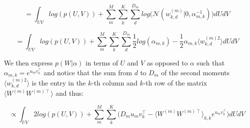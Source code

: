 \documentclass{article}
\begin{document}
$$ = \int_{UV}{log(p(U,V)) + \sum_m^M{\sum_k^K{\sum_d^{D_m}{log\Big(\mathcal{N}(w_{k,d}^{(m)}|0,\alpha_{m,k}^{-1})\Big)}}}dUdV}$$

$$ = \int_{UV}{log(p(U,V)) + \sum_m^M{\sum_k^K{\sum_d^{D_m}{\frac{1}{2}log(\alpha_{m,k}) - \frac{1}{2}\alpha_{m,k}\langle w_{k,d}^{(m)2}\rangle }}}dUdV}$$

We then express $p(W|\alpha)$ in terms of $U$ and $V$ as opposed to $\alpha$ such that $\alpha_{m,k} = e^{u_m v_k^\intercal}$ and notice that the sum from $d$ to $D_m$ of the second moments $\langle w_{k,d}^{(m)2}\rangle$ is the entry in the $k$-th column and $k$-th row of the matrix $\langle W^{(m)}W^{(m)\intercal}\rangle$ and thus:

$$\propto \int_{UV}{2log(p(U,V)) + \sum_m^M{\sum_k^K{\Big(D_m u_m v_k^\intercal - \langle W^{(m)}W^{(m)\intercal}\rangle_{k,k}e^{u_m v_k^\intercal}  \Big) }}dUdV}$$
\end{document}

